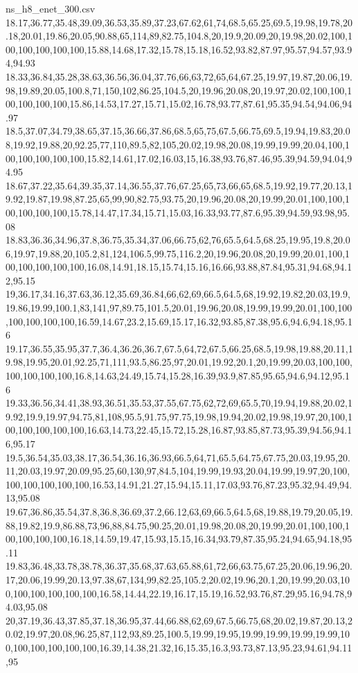 \begin{filecontents*}[overwrite]{ns_h8_enet_300.csv}
18.17,36.77,35.48,39.09,36.53,35.89,37.23,67.62,61,74,68.5,65.25,69.5,19.98,19.78,20.18,20.01,19.86,20.05,90.88,65,114,89,82.75,104.8,20,19.9,20.09,20,19.98,20.02,100,100,100,100,100,100,15.88,14.68,17.32,15.78,15.18,16.52,93.82,87.97,95.57,94.57,93.94,94.93
18.33,36.84,35.28,38.63,36.56,36.04,37.76,66,63,72,65,64,67.25,19.97,19.87,20.06,19.98,19.89,20.05,100.8,71,150,102,86.25,104.5,20,19.96,20.08,20,19.97,20.02,100,100,100,100,100,100,15.86,14.53,17.27,15.71,15.02,16.78,93.77,87.61,95.35,94.54,94.06,94.97
18.5,37.07,34.79,38.65,37.15,36.66,37.86,68.5,65,75,67.5,66.75,69.5,19.94,19.83,20.08,19.92,19.88,20,92.25,77,110,89.5,82,105,20.02,19.98,20.08,19.99,19.99,20.04,100,100,100,100,100,100,15.82,14.61,17.02,16.03,15,16.38,93.76,87.46,95.39,94.59,94.04,94.95
18.67,37.22,35.64,39.35,37.14,36.55,37.76,67.25,65,73,66,65,68.5,19.92,19.77,20.13,19.92,19.87,19.98,87.25,65,99,90,82.75,93.75,20,19.96,20.08,20,19.99,20.01,100,100,100,100,100,100,15.78,14.47,17.34,15.71,15.03,16.33,93.77,87.6,95.39,94.59,93.98,95.08
18.83,36.36,34.96,37.8,36.75,35.34,37.06,66.75,62,76,65.5,64.5,68.25,19.95,19.8,20.06,19.97,19.88,20,105.2,81,124,106.5,99.75,116.2,20,19.96,20.08,20,19.99,20.01,100,100,100,100,100,100,16.08,14.91,18.15,15.74,15.16,16.66,93.88,87.84,95.31,94.68,94.12,95.15
19,36.17,34.16,37.63,36.12,35.69,36.84,66,62,69,66.5,64.5,68,19.92,19.82,20.03,19.9,19.86,19.99,100.1,83,141,97,89.75,101.5,20.01,19.96,20.08,19.99,19.99,20.01,100,100,100,100,100,100,16.59,14.67,23.2,15.69,15.17,16.32,93.85,87.38,95.6,94.6,94.18,95.16
19.17,36.55,35.95,37.7,36.4,36.26,36.7,67.5,64,72,67.5,66.25,68.5,19.98,19.88,20.11,19.98,19.95,20.01,92.25,71,111,93.5,86.25,97,20.01,19.92,20.1,20,19.99,20.03,100,100,100,100,100,100,16.8,14.63,24.49,15.74,15.28,16.39,93.9,87.85,95.65,94.6,94.12,95.16
19.33,36.56,34.41,38.93,36.51,35.53,37.55,67.75,62,72,69,65.5,70,19.94,19.88,20.02,19.92,19.9,19.97,94.75,81,108,95.5,91.75,97.75,19.98,19.94,20.02,19.98,19.97,20,100,100,100,100,100,100,16.63,14.73,22.45,15.72,15.28,16.87,93.85,87.73,95.39,94.56,94.16,95.17
19.5,36.54,35.03,38.17,36.54,36.16,36.93,66.5,64,71,65.5,64.75,67.75,20.03,19.95,20.11,20.03,19.97,20.09,95.25,60,130,97,84.5,104,19.99,19.93,20.04,19.99,19.97,20,100,100,100,100,100,100,16.53,14.91,21.27,15.94,15.11,17.03,93.76,87.23,95.32,94.49,94.13,95.08
19.67,36.86,35.54,37.8,36.8,36.69,37.2,66.12,63,69,66.5,64.5,68,19.88,19.79,20.05,19.88,19.82,19.9,86.88,73,96,88,84.75,90.25,20.01,19.98,20.08,20,19.99,20.01,100,100,100,100,100,100,16.18,14.59,19.47,15.93,15.15,16.34,93.79,87.35,95.24,94.65,94.18,95.11
19.83,36.48,33.78,38.78,36.37,35.68,37.63,65.88,61,72,66,63.75,67.25,20.06,19.96,20.17,20.06,19.99,20.13,97.38,67,134,99,82.25,105.2,20.02,19.96,20.1,20,19.99,20.03,100,100,100,100,100,100,16.58,14.44,22.19,16.17,15.19,16.52,93.76,87.29,95.16,94.78,94.03,95.08
20,37.19,36.43,37.85,37.18,36.95,37.44,66.88,62,69,67.5,66.75,68,20.02,19.87,20.13,20.02,19.97,20.08,96.25,87,112,93,89.25,100.5,19.99,19.95,19.99,19.99,19.99,19.99,100,100,100,100,100,100,16.39,14.38,21.32,16,15.35,16.3,93.73,87.13,95.23,94.61,94.11,95
\end{filecontents*}

